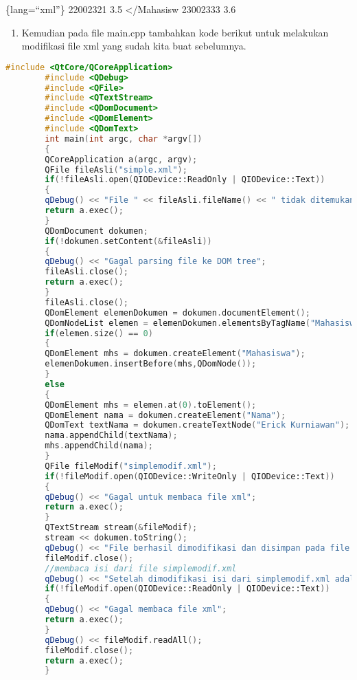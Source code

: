 \{lang=``xml''\} 22002321 3.5 \textless{}/Mahasisw 23002333 3.6

\begin{enumerate}
\def\labelenumi{\arabic{enumi}.}
\setcounter{enumi}{2}
\tightlist
\item
  Kemudian pada file main.cpp tambahkan kode berikut untuk melakukan
  modifikasi file xml yang sudah kita buat sebelumnya.
\end{enumerate}

\begin{lstlisting}[language=c++]
        #include <QtCore/QCoreApplication>
        #include <QDebug>
        #include <QFile>
        #include <QTextStream>
        #include <QDomDocument>
        #include <QDomElement>
        #include <QDomText>
        int main(int argc, char *argv[])
        {
        QCoreApplication a(argc, argv);
        QFile fileAsli("simple.xml");
        if(!fileAsli.open(QIODevice::ReadOnly | QIODevice::Text))
        {
        qDebug() << "File " << fileAsli.fileName() << " tidak ditemukan";
        return a.exec();
        }
        QDomDocument dokumen;
        if(!dokumen.setContent(&fileAsli))
        {
        qDebug() << "Gagal parsing file ke DOM tree";
        fileAsli.close();
        return a.exec();
        }
        fileAsli.close();
        QDomElement elemenDokumen = dokumen.documentElement();
        QDomNodeList elemen = elemenDokumen.elementsByTagName("Mahasiswa");
        if(elemen.size() == 0)
        {
        QDomElement mhs = dokumen.createElement("Mahasiswa");
        elemenDokumen.insertBefore(mhs,QDomNode());
        }
        else
        {
        QDomElement mhs = elemen.at(0).toElement();
        QDomElement nama = dokumen.createElement("Nama");
        QDomText textNama = dokumen.createTextNode("Erick Kurniawan");
        nama.appendChild(textNama);
        mhs.appendChild(nama);
        }
        QFile fileModif("simplemodif.xml");
        if(!fileModif.open(QIODevice::WriteOnly | QIODevice::Text))
        {
        qDebug() << "Gagal untuk membaca file xml";
        return a.exec();
        }
        QTextStream stream(&fileModif);
        stream << dokumen.toString();
        qDebug() << "File berhasil dimodifikasi dan disimpan pada file simplemodif.xml";
        fileModif.close();
        //membaca isi dari file simplemodif.xml
        qDebug() << "Setelah dimodifikasi isi dari simplemodif.xml adalah";
        if(!fileModif.open(QIODevice::ReadOnly | QIODevice::Text))
        {
        qDebug() << "Gagal membaca file xml";
        return a.exec();
        }
        qDebug() << fileModif.readAll();
        fileModif.close();
        return a.exec();
        }
\end{lstlisting}


